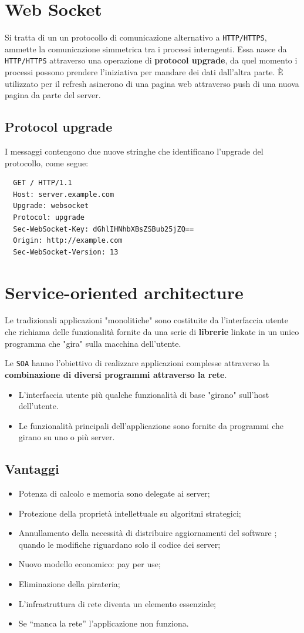 \documentclass[oneside,a4paper,11pt]{book}
\theoremstyle{italicstyle}
\theoremstyle{normStyle}
\begin{document}
\section{Web Socket}
Si tratta di un un protocollo di comunicazione alternativo a \verb|HTTP/HTTPS|, ammette
la comunicazione simmetrica tra i processi interagenti. Essa nasce da 
\verb|HTTP/HTTPS| attraverso una operazione di \textbf{protocol upgrade}, da quel 
momento i processi possono prendere l'iniziativa per mandare dei dati dall'altra 
parte. È utilizzato per il refresh asincrono di una pagina web attraverso push 
di una nuova pagina da parte del server.
\subsection{Protocol upgrade}
I messaggi contengono due nuove stringhe che identificano l'upgrade del 
protocollo, come segue:
\begin{verbatim}
  GET / HTTP/1.1
  Host: server.example.com
  Upgrade: websocket
  Protocol: upgrade
  Sec-WebSocket-Key: dGhlIHNhbXBsZSBub25jZQ== 
  Origin: http://example.com 
  Sec-WebSocket-Version: 13
\end{verbatim}
\section{Service-oriented architecture}
Le tradizionali applicazioni "monolitiche" sono costituite da l'interfaccia utente che 
richiama delle funzionalità fornite da una serie di \textbf{librerie} linkate 
in un unico programma che "gira" sulla macchina dell'utente.

Le \verb|SOA| hanno l'obiettivo di realizzare applicazioni complesse attraverso la 
\textbf{combinazione di diversi programmi attraverso la rete}.
\begin{itemize}
  \item L'interfaccia utente più qualche funzionalità di base "girano" sull'host dell'utente.
  \item Le funzionalità principali dell’applicazione sono fornite da programmi che girano su uno o più server.
\end{itemize}
\subsection{Vantaggi}
\begin{itemize}
  \item Potenza di calcolo e memoria sono delegate ai server;
  \item Protezione della proprietà intellettuale su algoritmi strategici;
  \item Annullamento della necessità di distribuire aggiornamenti del software ;
  quando le modifiche riguardano solo il codice dei server;
  \item Nuovo modello economico: pay per use;
  \item Eliminazione della pirateria;
  \item L’infrastruttura di rete diventa un elemento essenziale;
  \item Se “manca la rete” l’applicazione non funziona.
\end{itemize} 
\end{document}
